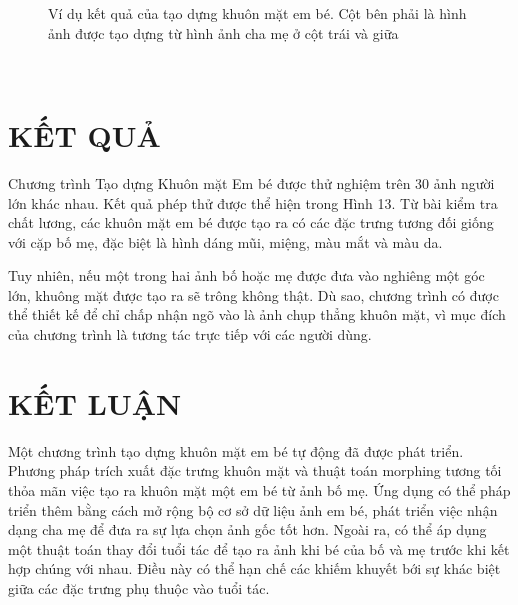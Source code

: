 \documentclass[journal]{IEEEtran}
\begin{document}
\begin{figure}[!ht]
\label{refhinh13}
\caption{Ví dụ kết quả của tạo dựng khuôn mặt em bé. Cột bên phải là hình ảnh được tạo dựng từ hình ảnh cha mẹ ở cột trái và giữa}
\end{figure}

\newpage
~
\newpage
\section{KẾT QUẢ}
Chương trình Tạo dựng Khuôn mặt Em bé được thử nghiệm trên 30 ảnh người lớn khác nhau. Kết quả phép thử được thể hiện trong Hình 13. Từ bài kiểm tra chất lương, các khuôn mặt em bé được tạo ra có các đặc trưng tương đối giống với cặp bố mẹ, đặc biệt là hình dáng mũi, miệng, màu mắt và màu da.

Tuy nhiên, nếu một trong hai ảnh bố hoặc mẹ được đưa vào nghiêng một góc lớn, khuông mặt được tạo ra sẽ trông không thật. Dù sao, chương trình có được thể thiết kế để chỉ chấp nhận ngõ vào là ảnh chụp thẳng khuôn mặt, vì mục đích của chương trình là tương tác trực tiếp với các người dùng.


\section{KẾT LUẬN}
Một chương trình tạo dựng khuôn mặt em bé tự động đã được phát triển. Phương pháp trích xuất đặc trưng khuôn mặt và thuật toán morphing tương tối thỏa mãn việc tạo ra khuôn mặt một em bé từ ảnh bố mẹ. Ứng dụng có thể pháp triển thêm bằng cách mở rộng bộ cơ sở dữ liệu ảnh em bé, phát triển việc nhận dạng cha mẹ để đưa ra sự lựa chọn ảnh gốc tốt hơn. Ngoài ra, có thể áp dụng một thuật toán thay đổi tuổi tác để tạo ra ảnh khi bé của bố và mẹ trước khi kết hợp chúng với nhau. Điều này có thể hạn chế các khiếm khuyết bới sự khác biệt giữa các đặc trưng phụ thuộc vào tuổi tác.
\end{document}
